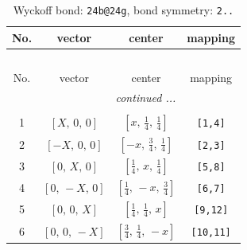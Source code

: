 \documentclass[fleqn,8pt]{jsarticle}
\begin{document}
\begin{longtable}{cccc}
\caption{Wyckoff bond: {\tt 24b@24g}, bond symmetry: {\tt 2..}}
 \\
 \hline \hline
No. & vector & center & mapping \\ \hline \endfirsthead

\multicolumn{3}{l}{\tablename\ \thetable{}} \\
 \hline \hline
No. & vector & center & mapping \\ \hline \endhead

 \hline \hline
\multicolumn{3}{r}{\footnotesize\it continued ...} \\ \endfoot

 \hline \hline
\multicolumn{3}{r}{} \\ \endlastfoot

1 & $\left[ X,\, 0,\, 0 \right]$ & $\left[ x,\, \frac{1}{4},\, \frac{1}{4} \right]$ & {\tt [1,4]} \\ \hline
2 & $\left[ - X,\, 0,\, 0 \right]$ & $\left[ - x,\, \frac{3}{4},\, \frac{1}{4} \right]$ & {\tt [2,3]} \\ \hline
3 & $\left[ 0,\, X,\, 0 \right]$ & $\left[ \frac{1}{4},\, x,\, \frac{1}{4} \right]$ & {\tt [5,8]} \\ \hline
4 & $\left[ 0,\, - X,\, 0 \right]$ & $\left[ \frac{1}{4},\, - x,\, \frac{3}{4} \right]$ & {\tt [6,7]} \\ \hline
5 & $\left[ 0,\, 0,\, X \right]$ & $\left[ \frac{1}{4},\, \frac{1}{4},\, x \right]$ & {\tt [9,12]} \\ \hline
6 & $\left[ 0,\, 0,\, - X \right]$ & $\left[ \frac{3}{4},\, \frac{1}{4},\, - x \right]$ & {\tt [10,11]} \\
\end{longtable}
\renewcommand{\arraystretch}{1.2}
\end{document}
